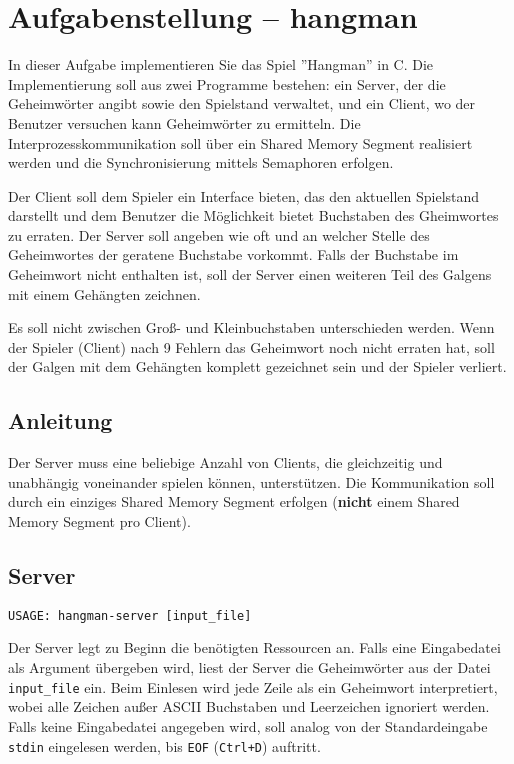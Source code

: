 



\section*{Aufgabenstellung -- hangman}


In dieser Aufgabe implementieren Sie das Spiel ''Hangman'' in C. Die Implementierung soll aus
zwei Programme bestehen: ein Server, der die Geheimwörter angibt sowie den Spielstand verwaltet,
und ein Client, wo der Benutzer versuchen kann Geheimwörter zu ermitteln.
Die Interprozesskommunikation soll über ein Shared Memory Segment realisiert werden und die
Synchronisierung mittels Semaphoren erfolgen. 


Der Client soll dem Spieler ein Interface bieten, das den aktuellen Spielstand darstellt und
dem Benutzer die Möglichkeit bietet Buchstaben des Gheimwortes zu erraten.
Der Server soll angeben wie oft 
und an welcher Stelle des Geheimwortes der geratene Buchstabe vorkommt. Falls der Buchstabe 
im Geheimwort nicht enthalten ist, soll der Server einen weiteren Teil des Galgens mit
einem Gehängten zeichnen. 

Es soll nicht zwischen Groß- und Kleinbuchstaben unterschieden werden. Wenn der Spieler (Client) nach 
9 Fehlern das Geheimwort noch nicht erraten hat, soll der Galgen mit dem Gehängten komplett gezeichnet
sein und der Spieler verliert.

\subsection*{Anleitung}
Der Server muss eine beliebige Anzahl von Clients, die gleichzeitig und unabhängig 
voneinander spielen k{\"o}nnen, unterstützen. Die Kommunikation soll
durch ein einziges Shared Memory Segment erfolgen (\textbf{nicht} einem Shared Memory Segment
pro Client).


\subsection*{Server}

\begin{verbatim}
USAGE: hangman-server [input_file]
\end{verbatim}

Der Server legt zu Beginn die benötigten Ressourcen an. Falls eine Eingabedatei als Argument übergeben
wird, liest der Server die Geheimwörter aus der Datei \verb|input_file| ein. Beim Einlesen wird
jede Zeile als ein Geheimwort interpretiert, wobei alle Zeichen außer ASCII Buchstaben und
Leerzeichen ignoriert werden. Falls keine 
Eingabedatei angegeben wird, soll analog von der Standardeingabe \verb|stdin| eingelesen werden,
bis \verb|EOF| (\verb|Ctrl+D|) auftritt.

